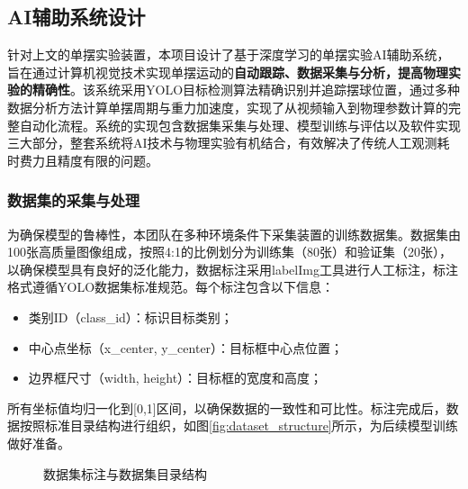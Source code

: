 \subsection{AI辅助系统设计}

针对上文的单摆实验装置，本项目设计了基于深度学习的单摆实验AI辅助系统，旨在通过计算机视觉技术实现单摆运动的\textbf{自动跟踪、数据采集与分析，提高物理实验的精确性}。该系统采用YOLO目标检测算法精确识别并追踪摆球位置，通过多种数据分析方法计算单摆周期与重力加速度，实现了从视频输入到物理参数计算的完整自动化流程。系统的实现包含数据集采集与处理、模型训练与评估以及软件实现三大部分，整套系统将AI技术与物理实验有机结合，有效解决了传统人工观测耗时费力且精度有限的问题。

\subsubsection{数据集的采集与处理}

为确保模型的鲁棒性，本团队在多种环境条件下采集装置的训练数据集。数据集由100张高质量图像组成，按照4:1的比例划分为训练集（80张）和验证集（20张），以确保模型具有良好的泛化能力，数据标注采用labelImg工具进行人工标注，标注格式遵循YOLO数据集标准规范。每个标注包含以下信息：
\begin{itemize}
    \item 类别ID（class\_id）：标识目标类别；
    \item 中心点坐标（x\_center, y\_center）：目标框中心点位置；
    \item 边界框尺寸（width, height）：目标框的宽度和高度；
\end{itemize}

所有坐标值均归一化到[0,1]区间，以确保数据的一致性和可比性。标注完成后，数据按照标准目录结构进行组织，如图\ref{fig:dataset_structure}所示，为后续模型训练做好准备。

\begin{figure}[H]
    \centering
    \hfill
    \caption{数据集标注与数据集目录结构}
    \label{fig:dataset}
\end{figure}

